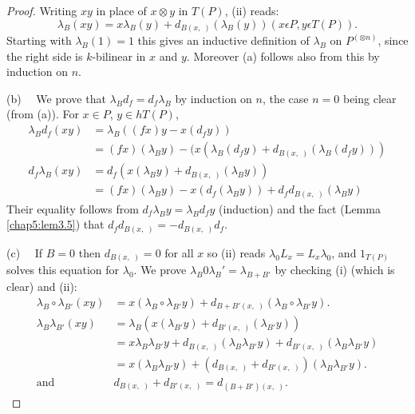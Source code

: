 \begin{proof}
Writing $xy$ in place of $x \otimes y$ in $T(P)$, (ii) reads:
$$
\lambda_B (xy) = x \lambda_B (y) + d_{B(x,\; )}(\lambda_B (y)) (x
\epsilon P, y \epsilon T(P)). 
$$
Starting with $\lambda_B (1) = 1$ this gives an inductive definition
of $\lambda_B$ on $P^{(\otimes n)}$, since the right side is
$k$-bilinear in $x$ and $y$. Moreover (a) follows also from this by
induction on $n$. 

(b)~~ We prove that $\lambda_B d_f = d_f \lambda_B$ by induction on $n$,
the case $n = 0$ being clear (from (a)). For $x \in P$, $y
\in h T(P)$, 
\begin{align*}
\lambda_B d_f (xy) & = \lambda_B ((fx) y - x(d_f y))\\
& =(fx) (\lambda_B y) - (x( \lambda_B (d_f y) + d_{B(x, \; )} (\lambda_B
(d_f y)))\\ 
d_f \lambda_B (xy) & = d_f (x (\lambda_B y ) + d_{B(x, \; )} (\lambda_B y ))\\
& = (fx) (\lambda_B y) - x(d_f(\lambda_B y)) + d_f d_{B(x, \; )}(\lambda_B y)
\end{align*}
Their equality follows from $d_f \lambda_B y=\lambda_B d_f y$
(induction) and the fact (Lemma \ref{chap5:lem3.5}) that $d_f
d_{B(x, \;  )}=-d_{B(x, \; )}d_f$. 

(c)~~ If $B = 0$ then $d_{B(x, \; )} = 0$ for all $x$ so (ii) reads
$\lambda_0 L_x = L_x \lambda_0$, and $1_{T(P)}$ solves this equation
for $\lambda_0$. We prove $\lambda_B 0 \lambda_B' = \lambda_{B+B'}$ by
checking (i) (which is clear) and (ii): 
\begin{align*}
\lambda_B \circ \lambda_{B'} (xy) & = x(\lambda_B \circ \lambda_{B'}
y) +d_{B+B' (x, \; )}(\lambda_B  \circ \lambda_{B'} y).\\ 
\lambda_B \lambda_{B'} (xy) & = \lambda_B (x (\lambda_{B'} y) +
d_{B'(x, \; )}(\lambda_{B'} y))\\ 
 & = x \lambda_B \lambda_{B'} y + d_{B(x, \; )}(\lambda_B \lambda_{B'} y) +
d_{B'(x, \; )} (\lambda_B \lambda_{B'} y) \\
& = x(\lambda_B \lambda_{B'} y) + (d_{B(x, \; )}+d_{B' (x, \; )}) (\lambda_B
  \lambda_{B'} y). \\
\text{and } & d_{B(x, \; )} + d_{B' (x, \; )} = d_{(B +B') (x, \; )}.  
\end{align*}


\end{proof}
